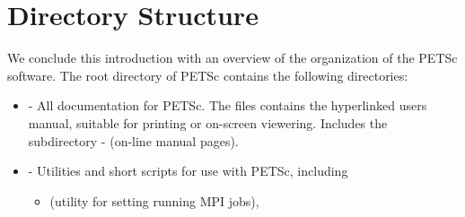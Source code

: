 
\section{Directory Structure}

We conclude this introduction with an overview of the
organization of the PETSc software.
The root directory of PETSc contains the following directories:

\begin{itemize}
\item {} - All documentation for PETSc. The files 
                   contains the hyperlinked users manual, suitable for printing
                   or on-screen viewering. Includes the subdirectory
 \subitem -  (on-line manual pages).
\item {} - Utilities and short scripts for use with PETSc, including
 \begin{itemize}
 \item {} (utility for setting running MPI jobs),
 \end{itemize}


\end{itemize}
